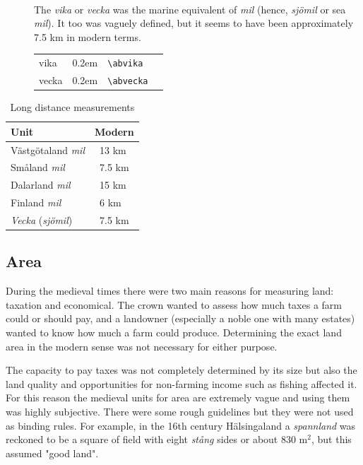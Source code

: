 \documentclass[a4paper]{article}
\newcommand{\samplefont}{\fontsize{16}{16}\abcursivefamily\spaceskip0.2em}
\newcommand{\sample}[1]{{\samplefont #1 \strut}}
\newcommand{\ltxncmd}[1]{\texttt{\textbackslash{}#1}}
\begin{document}
\begin{description}
\item [\sample{vika}, \sample{vecka} \emph{vecka}, \emph{sjömil}]
  \mbox{} \\
  The \emph{vika} or \emph{vecka} was the marine equivalent of
  \emph{mil} (hence, \emph{sjömil} or sea \emph{mil}). It too was
  vaguely defined, but it seems to have been approximately 7.5 km in
  modern terms.
  \begin{center}
    \begin{tabular}{llll}
      {}vika & \sample{\abvika} & \ltxncmd{abvika} \\
      {}vecka & \sample{\abvecka} & \ltxncmd{abvecka} \\
    \end{tabular}
  \end{center}

\end{description}


\begin{table}
  \centering
  \begin{tabular}{ll}
    Unit & Modern  \\
    \hline
    Västgötaland \emph{mil} & ~13 km  \\
    Småland \emph{mil} & ~7.5 km \\
    Dalarland \emph{mil} & ~15 km \\
    Finland \emph{mil} & ~6 km \\
    \emph{Vecka} (\emph{sjömil}) & ~7.5 km \\
  \end{tabular}
  \caption{Long distance measurements}
  \label{tab_long_distance}
\end{table}



\subsection{Area}

During the medieval times there were two main reasons for measuring
land: taxation and economical. The crown wanted to assess how much
taxes a farm could or should pay, and a landowner (especially a noble
one with many estates) wanted to know how much a farm could produce.
Determining the exact land area in the modern sense was not necessary
for either purpose.

The capacity to pay taxes was not completely determined by its size
but also the land quality and opportunities for non-farming income
such as fishing affected it. For this reason the medieval units for
area are extremely vague and using them was highly subjective. There
were some rough guidelines but they were not used as binding rules.
For example, in the 16th century Hälsingaland a \emph{spannland} was
reckoned to be a square of field with eight \emph{stång} sides or
about 830 m$^2$, but this assumed "good land".
\end{document}
